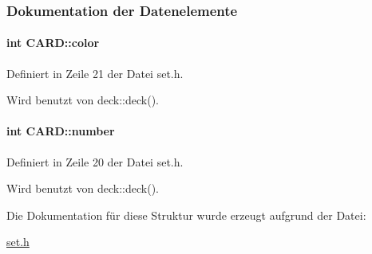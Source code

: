 \subsubsection{Dokumentation der Datenelemente}
\hypertarget{struct_c_a_r_d_a931664b6380e876a72b664225ddfe20d}{
\paragraph[{color}]{\setlength{\rightskip}{0pt plus 5cm}int C\-A\-R\-D\-::color}}\label{struct_c_a_r_d_a931664b6380e876a72b664225ddfe20d}


Definiert in Zeile 21 der Datei set.\-h.



Wird benutzt von deck\-::deck().

\hypertarget{struct_c_a_r_d_a36f0e6c29177b3e38a73a17c57d2f0ac}{
\paragraph[{number}]{\setlength{\rightskip}{0pt plus 5cm}int C\-A\-R\-D\-::number}}\label{struct_c_a_r_d_a36f0e6c29177b3e38a73a17c57d2f0ac}


Definiert in Zeile 20 der Datei set.\-h.



Wird benutzt von deck\-::deck().



Die Dokumentation für diese Struktur wurde erzeugt aufgrund der Datei\-:\begin{DoxyCompactItemize}
\item 
\hyperlink{set_8h}{set.\-h}\end{DoxyCompactItemize}
